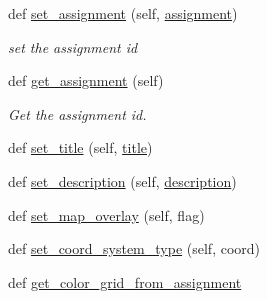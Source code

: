 \begin{DoxyCompactItemize}
def \hyperlink{classbridges_1_1bridges_1_1_bridges_add46441bec1c93095c48adc724b90e12}{set\+\_\+assignment} (self, \hyperlink{classbridges_1_1bridges_1_1_bridges_a1a89d732324054f1f349547373c9605c}{assignment})
\begin{DoxyCompactList}\small\item\em set the assignment id \end{DoxyCompactList}\item 
def \hyperlink{classbridges_1_1bridges_1_1_bridges_a1e7bd56f6a3beb03c91fc989cf3f7eb8}{get\+\_\+assignment} (self)
\begin{DoxyCompactList}\small\item\em Get the assignment id. \end{DoxyCompactList}\item 
def \hyperlink{classbridges_1_1bridges_1_1_bridges_a3b0c629c1ae0beaac05fa9d90846c423}{set\+\_\+title} (self, \hyperlink{classbridges_1_1bridges_1_1_bridges_a65faebe331a9b97a3da6772b39f822dc}{title})
\item 
def \hyperlink{classbridges_1_1bridges_1_1_bridges_aba86088c031b505bbe88dbc530bf1331}{set\+\_\+description} (self, \hyperlink{classbridges_1_1bridges_1_1_bridges_aa969453a479b7fee4a8b82345e3985ba}{description})
\item 
def \hyperlink{classbridges_1_1bridges_1_1_bridges_ae9ed34b5878d9d120949da0b7e4d2911}{set\+\_\+map\+\_\+overlay} (self, flag)
\item 
def \hyperlink{classbridges_1_1bridges_1_1_bridges_a6bc905490b1995234f88f47af9aa8a17}{set\+\_\+coord\+\_\+system\+\_\+type} (self, coord)
\item 
def \hyperlink{classbridges_1_1bridges_1_1_bridges_a11c2be346fba56589955894c5f84747d}{get\+\_\+color\+\_\+grid\+\_\+from\+\_\+assignment}
\end{DoxyCompactItemize}

